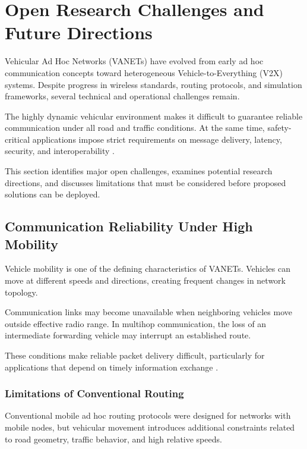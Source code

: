 
\section{Open Research Challenges and Future Directions}
\label{sec:future_challenges}

Vehicular Ad Hoc Networks (VANETs) have evolved
from early ad hoc communication concepts toward
heterogeneous Vehicle-to-Everything (V2X) systems.
Despite progress in wireless standards, routing
protocols, and simulation frameworks, several
technical and operational challenges remain.

The highly dynamic vehicular environment makes
it difficult to guarantee reliable communication
under all road and traffic conditions. At the
same time, safety-critical applications impose
strict requirements on message delivery, latency,
security, and interoperability
\cite{Karagiannis2011,Zeadally2012}.

This section identifies major open challenges,
examines potential research directions, and
discusses limitations that must be considered
before proposed solutions can be deployed.

\subsection{Communication Reliability Under High Mobility}

Vehicle mobility is one of the defining
characteristics of VANETs. Vehicles can move
at different speeds and directions, creating
frequent changes in network topology.

Communication links may become unavailable
when neighboring vehicles move outside
effective radio range. In multihop communication,
the loss of an intermediate forwarding vehicle
may interrupt an established route.

These conditions make reliable packet
delivery difficult, particularly for
applications that depend on timely
information exchange
\cite{Hartenstein2008,Zeadally2012}.

\subsubsection{Limitations of Conventional Routing}

Conventional mobile ad hoc routing protocols
were designed for networks with mobile nodes,
but vehicular movement introduces additional
constraints related to road geometry,
traffic behavior, and high relative speeds.

